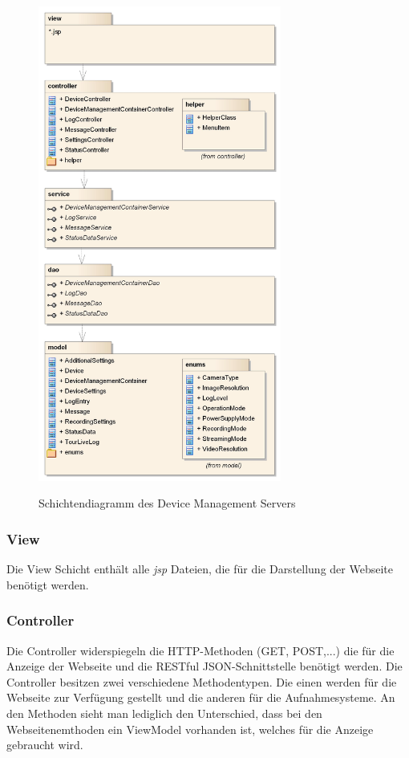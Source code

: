\begin{figure}[H]
	\centering
	\includegraphics[width=80mm]{images/devmgmtsrv/schichten.jpg}
	\label{fig:devmgmtsrvschichten}
	\caption{Schichtendiagramm des Device Management Servers}
\end{figure}

\subsubsection{View}
Die View Schicht enthält alle \textit{\gls{jsp}} Dateien, die für die Darstellung der Webseite benötigt werden. 

\subsubsection{Controller}
Die Controller widerspiegeln die HTTP-Methoden (GET, POST,...) die für die Anzeige der Webseite und die RESTful JSON-Schnittstelle benötigt werden. Die Controller besitzen zwei verschiedene Methodentypen. Die einen werden für die Webseite zur Verfügung gestellt und die anderen für die Aufnahmesysteme. An den Methoden sieht man lediglich den Unterschied, dass bei den Webseitenemthoden ein ViewModel vorhanden ist, welches für die Anzeige gebraucht wird.

